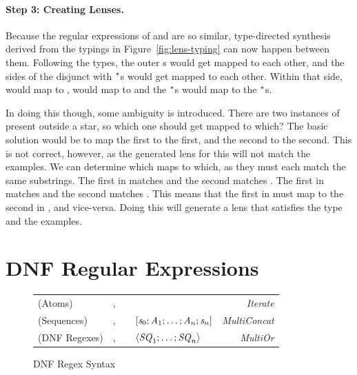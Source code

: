 \documentclass[numbers]{sigplanconf}
\begin{document}
\paragraph*{Step 3: Creating Lenses.}
Because the regular expressions of   and  are so
similar, type-directed synthesis derived from the typings in
Figure~\ref{fig:lens-typing} can now happen between them.
Following the types, the outer s
would get mapped to each other, and the sides of the disjunct with $^*$s
would get mapped to each other.  Within that side,  would map to
,  would map to  and the $^*$s would map to the
$^*$s.

In doing this though, some ambiguity is introduced.  There are two
instances of  present outside a star, so which one should get mapped to
which?  The basic solution would be to map the first to the first, and the
second to the second.  This is not correct, however, as the generated lens for
this will not match the examples.  We can determine which maps to which, as they
must each match the same substrings.  The first  in 
matches  and the second matches .  The first  in
 matches  and the second matches .
This means that the first  in  must map to the second
 in , and vice-versa.  Doing this will generate a lens
that satisfies the type and the examples.


\section{DNF Regular Expressions}

\begin{figure}
  \begin{tabular}{l@{\ }l@{\ }c@{\ }l@{\ }>{\itshape\/}r}

    (Atoms)& \Atom{},\AtomAlt{} & \GEq{} & \StarOf{\DNFRegex{}} & Iterate\\
    (Sequences)& \Sequence{},\SequenceAlt{} & \GEq{} &
                                                       $[\mathit{s}_0;\mathit{A}_1;\ldots;\mathit{A}_n;\mathit{s}_n]$ & MultiConcat\\
    (DNF Regexes)& \DNFRegex{},\DNFRegexAlt{} & \GEq{} & $\langle\mathit{SQ}_1;\ldots;\mathit{SQ}_n\rangle$ & MultiOr\\
  \end{tabular}
  \caption{DNF Regex Syntax} 
  \label{fig:dnf-regex-syntax}
\end{figure}
\end{document}
